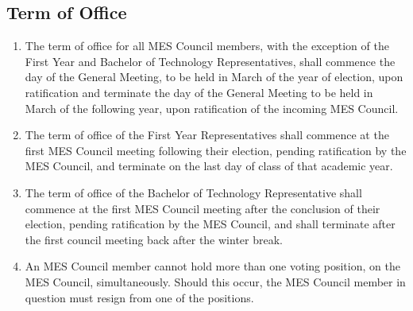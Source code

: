 \subsection{Term of Office}
\label{term-of-office}
\begin{enumerate}
 \item
  The term of office for all MES Council members, with the exception of
  the First Year and Bachelor of Technology Representatives, shall
  commence the day of the General Meeting, to be held in March of the
  year of election, upon ratification and terminate the day of the
  General Meeting to be held in March of the following year, upon
  ratification of the incoming MES Council.
 \item
  The term of office of the First Year Representatives shall commence at
  the first MES Council meeting following their election, pending
  ratification by the MES Council, and terminate on the last day of
  class of that academic year.
 \item
  The term of office of the Bachelor of Technology Representative shall
  commence at the first MES Council meeting after the conclusion of
  their election, pending ratification by the MES Council, and shall
  terminate after the first council meeting back after the winter break.
 \item
  An MES Council member cannot hold more than one voting position, on
  the MES Council, simultaneously. Should this occur, the MES Council
  member in question must resign from one of the positions.

\end{enumerate}
